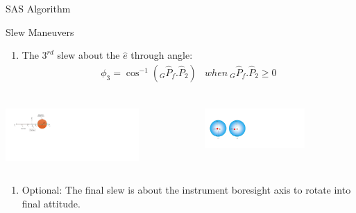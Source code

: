 \documentclass{beamer}
\begin{document}
\begin{frame}{SAS Algorithm}
\begin{block}{Slew Maneuvers}
\begin{enumerate}[III]
\item The $3^{rd}$ slew about the $\hat{e}$ through angle:
\begin{equation}
	\begin{array}{lr}
	\phi_3 = \cos^{-1}(_G\hat{P}_f.\hat{P}_2) & {\scriptstyle when} \  _G\hat{P}_f.\hat{P}_2\geq 0\\
	\end{array}
\end{equation}

\end{enumerate}
\begin{columns}
	\begin{column}{0.5\textwidth}
		\begin{center}
			\includegraphics[width=2in]{./Figures/SVAS_4r_modified.pdf}
		\end{center}
	\end{column}
	\begin{column}{0.5\textwidth}  %
		\begin{center}
			\includegraphics[width=1.5in]{./Figures/SASSchematic4}
		\end{center}
	\end{column}
\end{columns}
\begin{enumerate}[IV]
\item Optional: The final slew is about the instrument boresight axis to rotate into final attitude. 
\end{enumerate}
\end{block}
\end{frame}
\end{document}
